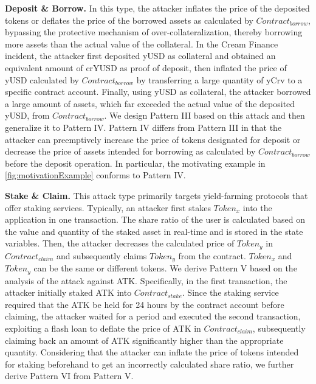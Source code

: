 \noindent\textbf{Deposit \& Borrow.}
In this type, the attacker inflates the price of the deposited tokens or deflates the price of the borrowed assets as calculated by $Contract_{borrow}$, bypassing the protective mechanism of over-collateralization, thereby borrowing more assets than the actual value of the collateral.
In the Cream Finance incident, the attacker first deposited yUSD as collateral and obtained an equivalent amount of crYUSD as proof of deposit, then inflated the price of yUSD calculated by $Contract_{borrow}$ by transferring a large quantity of yCrv to a specific contract account.
Finally, using yUSD as collateral, the attacker borrowed a large amount of assets, which far exceeded the actual value of the deposited yUSD, from $Contract_{borrow}$.
We design Pattern III based on this attack and then generalize it to Pattern IV.
Pattern IV differs from Pattern III in that the attacker can preemptively increase the price of tokens designated for deposit or decrease the price of assets intended for borrowing as calculated by $Contract_{borrow}$ before the deposit operation.
In particular, the motivating example in \mysec\ref{fig:motivationExample} conforms to Pattern IV.

\noindent\textbf{Stake \& Claim.}
This attack type primarily targets yield-farming protocols that offer staking services.
Typically, an attacker first stakes $Token_x$ into the application in one transaction.
The share ratio of the user is calculated based on the value and quantity of the staked asset in real-time and is stored in the state variables.
Then, the attacker decreases the calculated price of $Token_y$ in $Contract_{claim}$ and subsequently claims $Token_y$ from the contract.
$Token_x$ and $Token_y$ can be the same or different tokens.
We derive Pattern V based on the analysis of the attack against ATK.
Specifically, in the first transaction, the attacker initially staked ATK into $Contract_{stake}$.
Since the staking service required that the ATK be held for 24 hours by the contract account before claiming, the attacker waited for a period and executed the second transaction, exploiting a flash loan to deflate the price of ATK in $Contract_{claim}$, subsequently claiming back an amount of ATK significantly higher than the appropriate quantity.
Considering that the attacker can inflate the price of tokens intended for staking beforehand to get an incorrectly calculated share ratio, we further derive Pattern VI from Pattern V.

